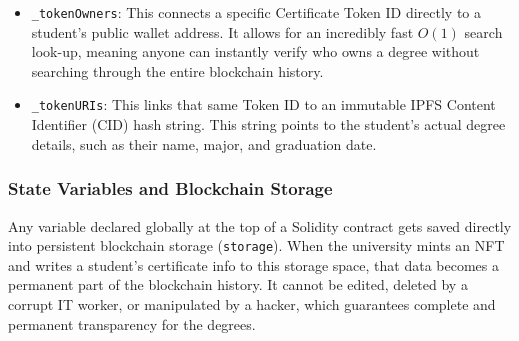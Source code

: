 \begin{itemize}
    \item \texttt{\_tokenOwners}: This connects a specific Certificate Token ID directly to a student's public wallet address. It allows for an incredibly fast $O(1)$ search look-up, meaning anyone can instantly verify who owns a degree without searching through the entire blockchain history.

    \item \texttt{\_tokenURIs}: This links that same Token ID to an immutable IPFS Content Identifier (CID) hash string. This string points to the student's actual degree details, such as their name, major, and graduation date.
\end{itemize}

\subsubsection{State Variables and Blockchain Storage}

Any variable declared globally at the top of a Solidity contract gets saved directly into persistent blockchain storage (\texttt{storage})\cite{onlinev0835web}. When the university mints an NFT and writes a student's certificate info to this storage space, that data becomes a permanent part of the blockchain history. It cannot be edited, deleted by a corrupt IT worker, or manipulated by a hacker, which guarantees complete and permanent transparency for the degrees.